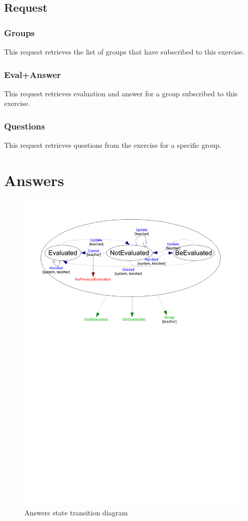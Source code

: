 	\subsection{Request}
		\subsubsection{Groups}
			This request retrieves the list of groups that have subscribed to this exercise.
		\subsubsection{Eval+Answer}
			This request retrieves evaluation and answer for a group subscribed to this exercise.
		\subsubsection{Questions}
			This request retrieves questions from the exercise for a specific group.
\newpage
\section{Answers}
	\begin{figure}[ht]
			\begin{center}
				\includegraphics[width=\textwidth,  trim=2cm 16cm 2cm 1cm]{UML_figure/state_transition/dojo_logic/st_answers.pdf}
				\caption{Answers state transition diagram}
			\end{center}
	\end{figure}
